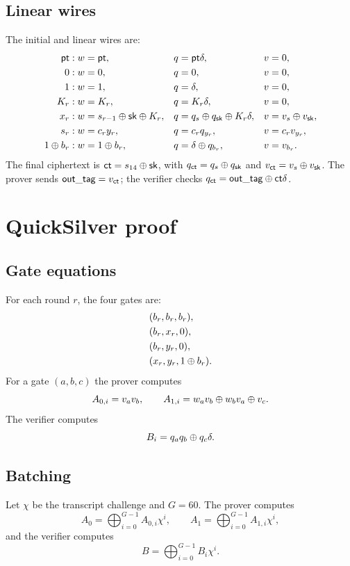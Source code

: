 \documentclass[11pt,a4paper]{article}
\begin{document}
\subsection{Linear wires}

The initial and linear wires are:
\begin{align}
\mathsf{pt} &: w=\mathsf{pt}, && q=\mathsf{pt}\delta, && v=0,\\
0 &: w=0, && q=0, && v=0,\\
1 &: w=1, && q=\delta, && v=0,\\
K_r &: w=K_r, && q=K_r\delta, && v=0,\\
x_r &: w=s_{r-1}\oplus\mathsf{sk}\oplus K_r, && q=q_s\oplus q_{\mathsf{sk}}\oplus K_r\delta, && v=v_s\oplus v_{\mathsf{sk}},\\
s_r &: w=c_r y_r, && q=c_r q_{y_r}, && v=c_r v_{y_r},\\
1\oplus b_r &: w=1\oplus b_r, && q=\delta\oplus q_{b_r}, && v=v_{b_r}.
\end{align}
The final ciphertext is $\mathsf{ct}=s_{14}\oplus\mathsf{sk}$, with
$q_{\mathsf{ct}}=q_s\oplus q_{\mathsf{sk}}$ and $v_{\mathsf{ct}}=v_s\oplus v_{\mathsf{sk}}$. The prover sends
$\mathsf{out\_tag}=v_{\mathsf{ct}}$; the verifier checks
$q_{\mathsf{ct}}=\mathsf{out\_tag}\oplus\mathsf{ct}\delta$.

\section{QuickSilver proof}

\subsection{Gate equations}

For each round $r$, the four gates are:
\begin{align}
&(b_r,b_r,b_r),\\
&(b_r,x_r,0),\\
&(b_r,y_r,0),\\
&(x_r,y_r,1\oplus b_r).
\end{align}
For a gate $(a,b,c)$ the prover computes
\[
A_{0,i}=v_a v_b,\qquad
A_{1,i}=w_a v_b\oplus w_b v_a\oplus v_c.
\]
The verifier computes
\[
B_i=q_a q_b\oplus q_c\delta.
\]

\subsection{Batching}

Let $\chi$ be the transcript challenge and $G=60$. The prover computes
\[
A_0=\bigoplus_{i=0}^{G-1}A_{0,i}\chi^i,\qquad
A_1=\bigoplus_{i=0}^{G-1}A_{1,i}\chi^i,
\]
and the verifier computes
\[
B=\bigoplus_{i=0}^{G-1}B_i\chi^i.
\]
\end{document}
